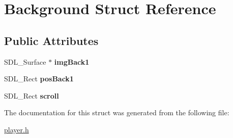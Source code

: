 \hypertarget{structBackground}{}\section{Background Struct Reference}
\label{structBackground}
\subsection*{Public Attributes}
\begin{DoxyCompactItemize}
\item 
\mbox{\label{structBackground_afa4c212ffa3e9bd35e8c8fbdbfffc713}} 
S\+D\+L\+\_\+\+Surface $\ast$ {\bfseries img\+Back1}
\item 
\mbox{\label{structBackground_ae809771cc16bc8f52896c34f2cbd5f5c}} 
S\+D\+L\+\_\+\+Rect {\bfseries pos\+Back1}
\item 
\mbox{\label{structBackground_a1b6382669cea0e079a66ae195d09efd9}} 
S\+D\+L\+\_\+\+Rect {\bfseries scroll}
\end{DoxyCompactItemize}


The documentation for this struct was generated from the following file\+:\begin{DoxyCompactItemize}
\item 
\hyperlink{player_8h}{player.\+h}\end{DoxyCompactItemize}
